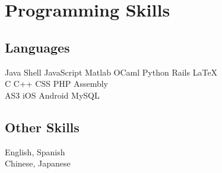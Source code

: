 \documentclass[]{deedy-resume-openfont}
\begin{document}
\section{Programming Skills}
\begin{minipage}[t]{.6\textwidth}
\subsection{Languages}
Java \textbullet{}   Shell \textbullet{} JavaScript \textbullet{} Matlab \textbullet{}
OCaml \textbullet{} Python \textbullet{} Rails \textbullet{} \LaTeX\ \\ 
C \textbullet{} C++ \textbullet{} CSS \textbullet{} PHP \textbullet{} Assembly \\
AS3 \textbullet{} iOS \textbullet{} Android \textbullet{} MySQL
\sectionsep
\end{minipage}
\hfill
\begin{minipage}[t]{.35\textwidth}
\subsection{Other Skills}
 English, Spanish\\
 Chinese, Japanese\\
\end{minipage}

\end{document}
